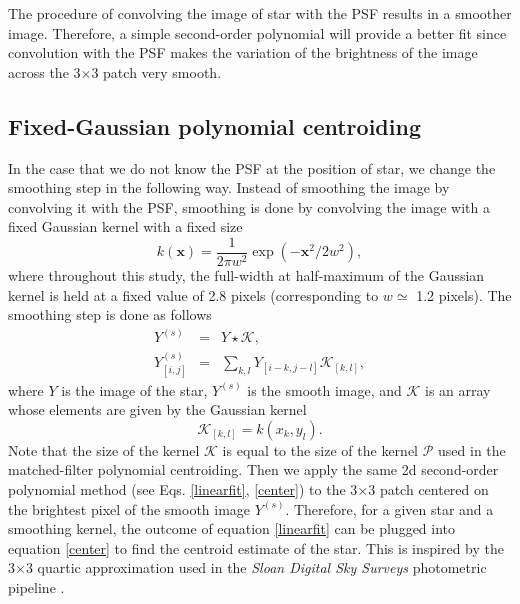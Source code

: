 \documentclass[onecolumn]{aastex61}
\newcommand{\beq}{\begin{equation}}
\newcommand{\eeq}{\end{equation}}
\newcommand{\todo}[1]{{\textcolor{dred}{ #1}}}
\begin{document}
The procedure of convolving the image of star with the PSF results in a
smoother image. Therefore, a simple second-order polynomial will provide a better fit 
since convolution with the PSF makes the variation of the brightness of the image 
across the 3$\times$3 patch very smooth.

 
\todo{\subsection{Fixed-Gaussian polynomial centroiding}}
In the case that we do not know the PSF at the position of star, we change 
the smoothing step in the following way. Instead of smoothing the image 
by convolving it with the PSF, smoothing is done by convolving the image 
with a \todo{fixed Gaussian kernel with a fixed size} 
\beq
k(\mathbf{x}) = \frac{1}{2\pi w^2}\exp(-\mathbf{x}^{2}/2w^{2}),
\label{eq:gauss}
\eeq
where throughout this study, the full-width at half-maximum of the Gaussian kernel is held at
a fixed value of 2.8 pixels (corresponding to $w \simeq$ 1.2 pixels). The smoothing step is done as follows
\begin{eqnarray}
Y^{(s)} &=& Y \star \mathcal{K}, \\
Y^{(s)}_{[i,j]} &=& \sum_{k,l}Y_{[i-k,j-l]}\mathcal{K}_{[k,l]},
\end{eqnarray}
where $Y$ is the image of the star, $Y^{(s)}$ is the smooth image, \todo{and $\mathcal{K}$ is an
array whose elements are given by the Gaussian kernel}
\beq
\mathcal{K}_{[k,l]} = k(x_{k},y_{l}).
\eeq
\todo{Note that the size of the kernel $\mathcal{K}$ is equal to the size of the kernel $\mathcal{P}$ used in 
the matched-filter polynomial centroiding.} Then we apply the same 2d second-order polynomial method (see Eqs. \ref{linearfit}, \ref{center}) to the 3$\times$3 patch centered on the brightest
pixel of the smooth image $Y^{(s)}$. Therefore, for a given star and a smoothing kernel,
the outcome of equation \ref{linearfit} can be
plugged into equation \ref{center} to find the centroid estimate
of the star. This is inspired by the 3$\times$3 quartic approximation 
used in the \textsl{Sloan Digital Sky Surveys} photometric pipeline \citep{sdss}.
\end{document}
